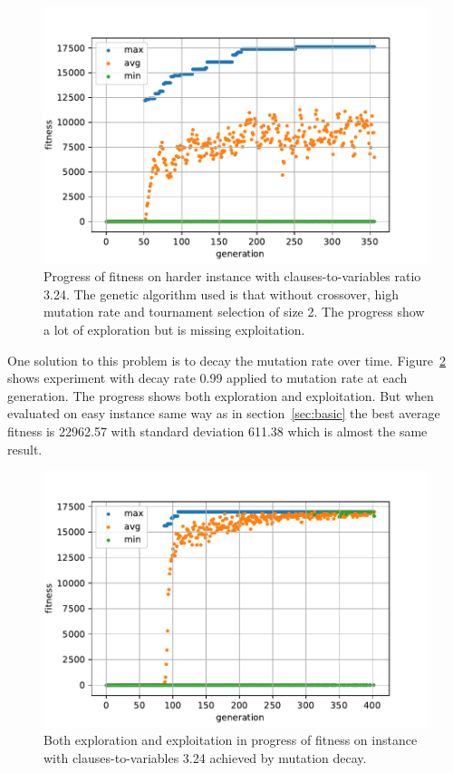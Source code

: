 \documentclass{article}
\begin{document}
\begin{figure}[ht]
\vskip 0.2in
\begin{center}
\centerline{\includegraphics[width=\columnwidth]{figs/mutation-progress}}
\caption{Progress of fitness on harder instance with clauses-to-variables
ratio 3.24. The genetic algorithm used is that without crossover,
high mutation rate and tournament selection of size 2.
The progress show a lot of exploration but is missing exploitation.}
\label{mutation-progress}
\end{center}
\vskip -0.2in
\end{figure}

One solution to this problem is to decay the mutation rate over time.
Figure~\ref{decay-progress} shows experiment with decay rate 0.99 applied to
mutation rate at each generation.
The progress shows both exploration and exploitation.
But when evaluated on easy instance same way as
in section~\ref{sec:basic} the best average fitness is 22962.57
with standard deviation 611.38 which is almost the same result.

\begin{figure}[ht]
\vskip 0.2in
\begin{center}
\centerline{\includegraphics[width=\columnwidth]{figs/decay-progress}}
\caption{Both exploration and exploitation in progress of fitness on
instance with clauses-to-variables 3.24 achieved by mutation decay.}
\label{decay-progress}
\end{center}
\vskip -0.2in
\end{figure}
\end{document}
